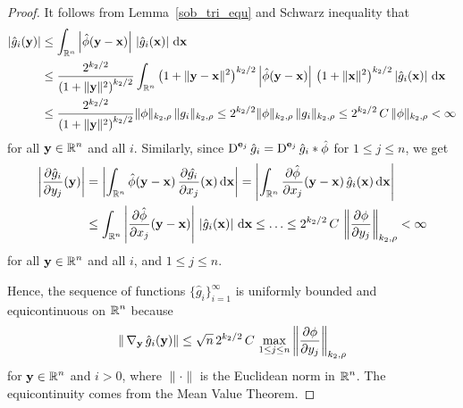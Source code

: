 \begin{proof}
It follows from Lemma~\ref{sob_tri_equ} and Schwarz inequality that
\begin{align*}
\left|\hat{g}_i(\mathbf{y})\right| &\leq
\int_{\mathbb{R}^n} \left| \hat{\phi}(\mathbf{y}-\mathbf{x})\right|\,
\left| \hat{g}_i(\mathbf{x}) \right| \,\mathrm{d}{\mathbf{x}} \\
&\leq \frac{2^{k_2/2}}{\left(1+\|\mathbf{y}\|^2\right)^{k_2/2}}
\int_{\mathbb{R}^n} \left(1+\|\mathbf{y}-\mathbf{x}\|^2\right)^{k_2/2}
\left| \hat{\phi}(\mathbf{y}-\mathbf{x})\right|\,
\left(1+\|\mathbf{x}\|^2\right)^{k_2/2} \left| \hat{g}_i(\mathbf{x}) \right|
\,\mathrm{d}{\mathbf{x}} \\
&\leq \frac{2^{k_2/2}}{\left(1+\|\mathbf{y}\|^2\right)^{k_2/2}} \|\phi\|_{k_2,\rho}
\, \|g_i\|_{k_2,\rho}
\leq 2^{k_2/2}\|\phi\|_{k_2,\rho}\, \|g_i\|_{k_2,\rho} \leq
2^{k_2/2}\,C\,\|\phi\|_{k_2,\rho} < \infty
\end{align*}
for all $\displaystyle \mathbf{y}\in \mathbb{R}^n$ and all $i$.  Similarly,
since $\displaystyle \operatorname{D}^{\mathbf{e}_j} \hat{g}_i
= \operatorname{D}^{\mathbf{e}_j} \hat{g}_i \ast \hat{\phi}$ for $1 \leq j \leq n$, we get
\begin{align*}
\left|\frac{\partial{\hat{g}_i}}{\partial y_j}(\mathbf{y})\right| &=
\left| \int_{\mathbb{R}^n} \hat{\phi}(\mathbf{y}-\mathbf{x})\,
\frac{\partial{\hat{g_i}}}{\partial x_j}(\mathbf{x}) \,\mathrm{d}{\mathbf{x}} \right|
= \left| \int_{\mathbb{R}^n} \frac{\partial{\hat{\phi}}}{\partial x_j}(\mathbf{y}-\mathbf{x})\,
\hat{g}_i(\mathbf{x}) \,\mathrm{d}{\mathbf{x}} \right| \\
&\leq \int_{\mathbb{R}^n} \left| \frac{\partial{\hat{\phi}}}{\partial x_j}(\mathbf{y}-\mathbf{x})\right|\,
\left|\hat{g}_i(\mathbf{x})\right| \,\mathrm{d}{\mathbf{x}} \leq \ldots 
\leq 2^{k_2/2}\,C\,\left\|\frac{\partial{\phi}}{\partial y_j}\right\|_{k_2,\rho} < \infty
\end{align*}
for all $\displaystyle \mathbf{y}\in \mathbb{R}^n$ and all $i$, and $1 \leq j \leq n$.

Hence, the sequence of functions $\displaystyle \{\hat{g}_i\}_{i=1}^\infty$ is
uniformly bounded and equicontinuous on $\displaystyle \mathbb{R}^n$ because
\[
\| \operatorname{\nabla}_{\mathbf{y}} \hat{g}_i(\mathbf{y}) \| \leq
\sqrt{n}\,2^{k_2/2}\,C
\,\max_{1\leq j\leq n} \left\|\frac{\partial{\phi}}{\partial y_j}\right\|_{k_2,\rho}
\]
for $\displaystyle \mathbf{y}\in \mathbb{R}^n$ and $i > 0$,
where $\|\cdot\|$ is the Euclidean norm in $\displaystyle \mathbb{R}^n$.  The
equicontinuity comes from the Mean Value Theorem.


\end{proof}
